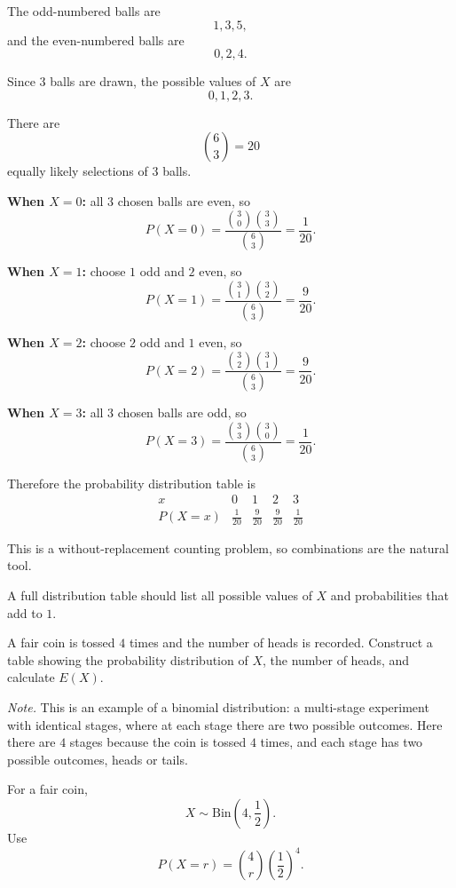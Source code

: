 \begin{solution}
The odd-numbered balls are
\[
1,3,5,
\]
and the even-numbered balls are
\[
0,2,4.
\]

Since $3$ balls are drawn, the possible values of $X$ are
\[
0,1,2,3.
\]

There are
\[
\binom63=20
\]
equally likely selections of $3$ balls.

\textbf{When $X=0$:} all $3$ chosen balls are even, so
\[
P(X=0)=\frac{\binom30\binom33}{\binom63}=\frac1{20}.
\]

\textbf{When $X=1$:} choose $1$ odd and $2$ even, so
\[
P(X=1)=\frac{\binom31\binom32}{\binom63}=\frac9{20}.
\]

\textbf{When $X=2$:} choose $2$ odd and $1$ even, so
\[
P(X=2)=\frac{\binom32\binom31}{\binom63}=\frac9{20}.
\]

\textbf{When $X=3$:} all $3$ chosen balls are odd, so
\[
P(X=3)=\frac{\binom33\binom30}{\binom63}=\frac1{20}.
\]

Therefore the probability distribution table is
\[
\begin{array}{c|cccc}
x & 0 & 1 & 2 & 3 \\
\hline
P(X=x) & \frac1{20} & \frac9{20} & \frac9{20} & \frac1{20}
\end{array}
\]
\end{solution}

\begin{takeaways}
\item This is a without-replacement counting problem, so combinations are the natural tool.
\item A full distribution table should list all possible values of $X$ and probabilities that add to $1$.
\end{takeaways}

\begin{problem}
A fair coin is tossed $4$ times and the number of heads is recorded. Construct a table showing the probability distribution of $X$, the number of heads, and calculate $E(X)$.

\medskip
\noindent\textit{Note.} This is an example of a binomial distribution: a multi-stage experiment with identical stages, where at each stage there are two possible outcomes. Here there are $4$ stages because the coin is tossed $4$ times, and each stage has two possible outcomes, heads or tails.
\end{problem}

\begin{hint}
For a fair coin,
\[
X\sim \mathrm{Bin}\left(4,\frac12\right).
\]
Use
\[
P(X=r)=\binom{4}{r}\left(\frac12\right)^4.
\]
\end{hint}

